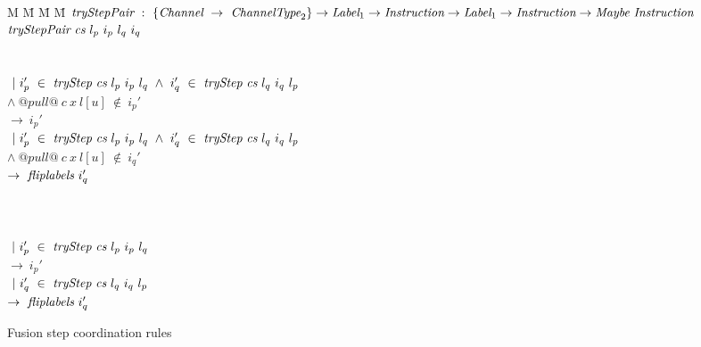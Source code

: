 \begin{figure}

\begin{tabbing}
M \= M \= M \= M \kill
$\textit{tryStepPair} ~:~ \{\textit{Channel} ~\to~ \textit{ChannelType}_2\} \to \textit{Label}_1 \to \textit{Instruction} \to \textit{Label}_1 \to \textit{Instruction} \to \textit{Maybe}~\textit{Instruction}$ \\
$\textit{tryStepPair} ~\textit{cs}~l_p~i_p~l_q~i_q$ \\
\\

\>  \\
\> $~|~i_p'~\in~\textit{tryStep}~\textit{cs}~l_p~i_p~l_q ~\wedge~ i_q'~\in~\textit{tryStep}~\textit{cs}~l_q~i_q~l_p$ \\
\> $\wedge~@pull@~c~x~l[u]~\not\in~i_p'$ \\
\> $\to~i_p'$ \\
\> $~|~i_p'~\in~\textit{tryStep}~\textit{cs}~l_p~i_p~l_q ~\wedge~i_q'~\in~\textit{tryStep}~\textit{cs}~l_q~i_q~l_p$ \\
\> $\wedge~@pull@~c~x~l[u]~\not\in~i_q'$ \\
\> $\to~\textit{fliplabels}~i_q'$ \\
\\

\>  \\
\>  \\
\> $~|~i_p'~\in~\textit{tryStep}~\textit{cs}~l_p~i_p~l_q$ \\
\> $\to~i_p'$ \\
\> $~|~i_q'~\in~\textit{tryStep}~\textit{cs}~l_q~i_q~l_p$ \\
\> $\to~\textit{fliplabels}~i_q'$ \\

\end{tabbing}

\caption{Fusion step coordination rules}
\label{fig:Fusion:Def:StepPair}
\end{figure}
